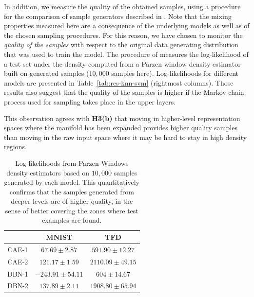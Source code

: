In addition, we measure the quality of the obtained samples, using a
procedure for the comparison of sample generators described in
\citet{Breuleux+Bengio-2011}.  Note that the mixing properties
measured here are a consequence of the underlying models
as well as of the chosen sampling procedures. For this reason, we have chosen
to monitor the {\em quality of the samples} with respect to the original
data generating distribution that was used to train the model.
The procedure of \citet{Breuleux+Bengio-2011} measures the log-likelihood of a test set
under the density computed from a Parzen window density estimator built on
generated samples ($10,000$ samples here). Log-likelihoods for different models are presented
in Table~\ref{tab:res-knn-svm} (rightmost columns).  Those results also suggest that the
quality of the samples is higher if the Markov chain process used for sampling
takes place in the upper layers.

This observation agrees with {\bf H3(b)} that moving in higher-level representation
spaces where the manifold has been expanded provides higher quality samples than
moving in the raw input space where it may be hard to stay in high density
regions.

\begin{table}[ht]
  \begin{center}
\begin{tabular}{c|c|c|}
& MNIST & TFD \\ \hline
CAE-1 & $ 67.69\pm2.87$ & $591.90\pm12.27$\\
CAE-2 & $121.17\pm1.59$ & $2110.09\pm49.15$ \\\hline
DBN-1 & $-243.91\pm54.11$ & $604\pm14.67$ \\
DBN-2 & $137.89\pm2.11$ & $1908.80\pm65.94$ \\ \hline
\end{tabular}

\caption{Log-likelihoods from Parzen-Windows density estimators based on
$10,000$ samples generated by each model. This quantitatively confirms
that the samples generated from deeper levels are of higher quality, in
the sense of better covering the zones where test examples are found. } 
\label{tab:ll}

\end{center}

\end{table}
\fi

\iffalse

